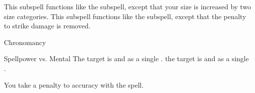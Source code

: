 This subspell functions like the  subspell, except that your size is increased by two size categories.
This subspell functions like the  subspell, except that the penalty to strike damage is removed.
\begin{spellsection}{Chronomancy}
\begin{spellheader}
\end{spellheader}
\begin{spellcontent}
\begin{spelltargetinginfo}
\end{spelltargetinginfo}
\begin{spelleffects}
\begin{spellattack}{Spellpower vs. Mental}
\spellsuccess
The target is  and  as a single .
\spellcritical
the target is  and  as a single .
\end{spellattack}
\end{spelleffects}
\end{spellcontent}
\begin{spellfooter}
\end{spellfooter}
\begin{spellsubcontent}
\begin{spellcantrip}
You take a  penalty to accuracy with the spell.
\end{spellcantrip}
\end{spellsubcontent}
\end{spellsection}

